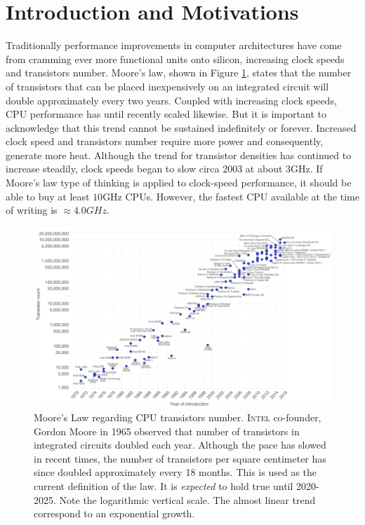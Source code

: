 \section{Introduction and Motivations}
Traditionally performance improvements in computer architectures have come from cramming ever more functional units onto silicon, increasing clock speeds and transistors number.
Moore's law, shown in Figure \ref{fig:moore}, states that the number of transistors that can be placed inexpensively on an integrated circuit will double approximately every two years.
Coupled with increasing clock speeds, CPU performance has until recently scaled likewise.
But it is important to acknowledge that this trend cannot be sustained indefinitely or forever.
Increased clock speed and transistors number require more power and consequently, generate more heat.
Although the trend for transistor densities has continued to increase steadily, clock speeds began to slow circa 2003 at about $3$GHz.
If Moore’s law type of thinking is applied to clock-speed performance, it should be able to buy at least $10$GHz CPUs. 
However, the fastest CPU available at the time of writing is $\approx 4.0 GHz$.
\begin{figure}[!htbp]
		\hspace*{-1.8cm}
\centering
\includegraphics[width=1.2\textwidth]{./images/parallel_programming/moore_law2}
\caption[Moore's Law regarding CPUs transistors number.]{Moore's Law regarding CPU transistors number. \textsc{Intel} co-founder, Gordon Moore in 1965 observed that number of transistors in integrated circuits doubled each year. Although the pace has slowed in recent times, the number of transistors per square centimeter has since doubled approximately every 18 months. This is used as the current definition of the law. It is \textit{expected} to hold true until 2020-2025. Note the logarithmic vertical scale. The almost linear trend correspond to an exponential growth.
}
\label{fig:moore}
\end{figure}

